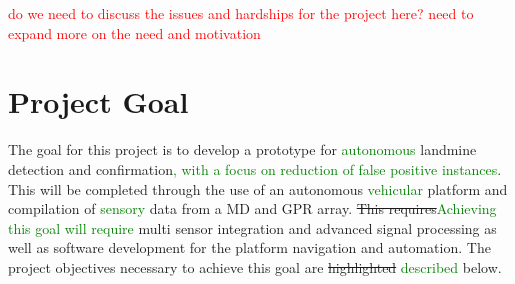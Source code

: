 \documentclass[main.tex]{subfiles}
\begin{document}

\textcolor{red}{do we need to discuss the issues and hardships for the project here?}
\textcolor{red}{need to expand more on the need and motivation}
\\\par



\section{Project Goal}

The goal for this project is to develop a prototype for \textcolor{green}{autonomous} landmine detection and confirmation\textcolor{green}{, with a focus on reduction of false positive instances}. This will be completed through the use of an autonomous \textcolor{green}{vehicular} platform and compilation of \textcolor{green}{sensory} data from a MD and GPR array. \sout{This requires}\textcolor{green}{Achieving this goal will require} multi sensor integration and advanced signal processing as well as software development for the platform navigation and automation. The project objectives necessary to achieve this goal are \sout{highlighted} \textcolor{green}{described} below. 




 
\end{document}
